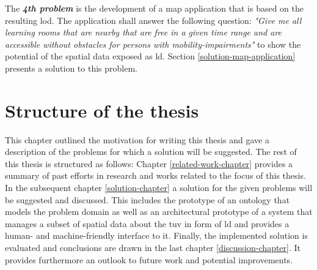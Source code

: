 \documentclass[draft,final]{vutinfth} %
\newcommand{\todo}[1]{{\color{red}\textbf{TODO: {#1}}}} %
\begin{document}
The \textbf{\textit{4th problem}} is the development of a map application that is based on the resulting \gls{lod}. The application shall answer the following question: \textit{"Give me all learning rooms that are nearby that are free in a given time range and are accessible without obstacles for persons with mobility-impairments"} to show the potential of the spatial data exposed as \gls{ld}. Section \ref{solution-map-application} presents a solution to this problem.

\section{Structure of the thesis}
This chapter outlined the motivation for writing this thesis and gave a description of the problems for which a solution will be suggested. The rest of this thesis is structured as follows: Chapter \ref{related-work-chapter} provides a summary of past efforts in research and works related to the focus of this thesis. In the subsequent chapter \ref{solution-chapter} a solution for the given problems will be suggested and discussed. This includes the prototype of an ontology that models the problem domain as well as an architectural prototype of a system that manages a subset of spatial data about the \gls{tuv} in form of \gls{ld} and provides a human- and machine-friendly interface to it. Finally, the implemented solution is evaluated and conclusions are drawn in the last chapter \ref{discussion-chapter}. It provides furthermore an outlook to future work and potential improvements. 




\end{document}
